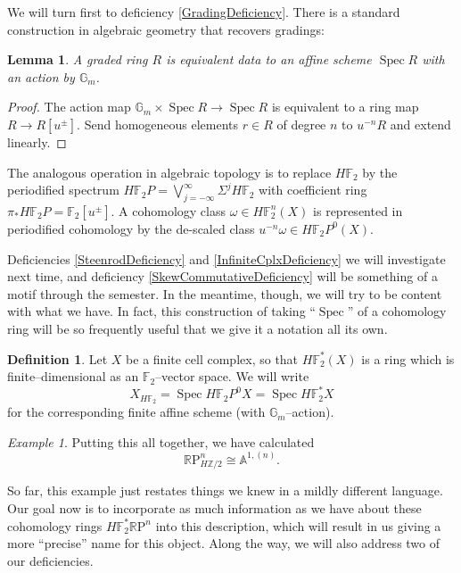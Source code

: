 \documentclass{article}
\newcommand{\Z}{\mathbb Z}
\newcommand{\F}{\mathbb F}
\newcommand{\G}{\mathbb G}
\newcommand{\R}{\mathbb R}
\newcommand{\RP}{\R\mathrm P}
\newcommand{\<}{\langle}
\renewcommand{\>}{\rangle}
\newcommand{\Susp}{\Sigma}
\DeclareMathOperator{\Spec}{Spec}
\numberwithin{equation}{section}
\theoremstyle{plain}
\newtheorem{lemma}[equation]{Lemma}
\theoremstyle{definition}
\newtheorem{definition}[equation]{Definition}
\theoremstyle{remark}
\newtheorem{example}[equation]{Example}
\begin{document}
We will turn first to deficiency \ref{GradingDeficiency}.  There is a standard construction in algebraic geometry that recovers gradings:
\begin{lemma}
A graded ring $R$ is equivalent data to an affine scheme $\Spec R$ with an action by $\mathbb G_m$.
\end{lemma}
\begin{proof}
 The action map $\mathbb G_m \times \Spec R \to \Spec R$ is equivalent to a ring map $R \to R[u^\pm]$.  Send homogeneous elements $r \in R$ of degree $n$ to $u^{-n} R$ and extend linearly.
\end{proof}
\noindent The analogous operation in algebraic topology is to replace $H\F_2$ by the periodified spectrum $H\F_2P = \bigvee_{j=-\infty}^\infty \Susp^j H\F_2$ with coefficient ring $\pi_* H\F_2P = \F_2[u^\pm]$.  A cohomology class $\omega \in H\F_2^n(X)$ is represented in periodified cohomology by the de-scaled class $u^{-n} \omega \in H\F_2P^0(X)$.




Deficiencies \ref{SteenrodDeficiency} and \ref{InfiniteCplxDeficiency} we will investigate next time, and deficiency \ref{SkewCommutativeDeficiency} will be something of a motif through the semester.  In the meantime, though, we will try to be content with what we have.  In fact, this construction of taking ``$\Spec$'' of a cohomology ring will be so frequently useful that we give it a notation all its own.

\begin{definition}
Let $X$ be a finite cell complex, so that $H\F_2^*(X)$ is a ring which is finite--dimensional as an $\F_2$--vector space.  We will write \[X_{H\F_2} = \Spec H\F_2P^0 X = \Spec H\F_2^* X\] for the corresponding finite affine scheme (with $\G_m$--action).
\end{definition}

\begin{example}
Putting this all together, we have calculated \[\RP^n_{H\Z/2} \cong \mathbb A^{1, (n)}.\]
\end{example}

So far, this example just restates things we knew in a mildly different language.  Our goal now is to incorporate as much information as we have about these cohomology rings $H\F_2^* \RP^n$ into this description, which will result in us giving a more ``precise'' name for this object.  Along the way, we will also address two of our deficiencies.
\end{document}
